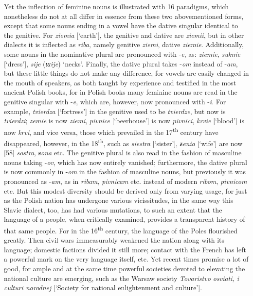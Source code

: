 Yet the inflection of feminine nouns is illustrated with 16 paradigms, which nonetheless do not at all differ in essence from these two abovementioned forms, except that some nouns ending in a vowel have the dative singular identical to the genitive. For \textit{ziemia} [‘earth’], the genitive and dative are \textit{ziemii}, but in other dialects it is inflected as \textit{riba}, namely genitive \textit{ziemi}, dative \textit{ziemie}. Additionally, some nouns in the nominative plural are pronounced with -\textit{e}, as: \textit{ziemie}, \textit{suknie} [‘dress’], \textit{sije} (\textit{шije}) ‘necks’. Finally, the dative plural takes -\textit{om} instead of -\textit{am}, but these little things do not make any difference, for vowels are easily changed in the mouth of speakers, as both taught by experience and testified in the most ancient Polish books, for in Polish books many feminine nouns are read in the genitive singular with -\textit{e}, which are, however, now pronounced with -\textit{i}. For example, \textit{tvierdza} [‘fortress’] in the genitive used to be \textit{tvierdze}, but now is \textit{tvierdzi}; \textit{zemie} is now \textit{ziemi}, \textit{pivnice} [‘beerhouse’] is now \textit{pivnici}, \textit{krvie} [‘blood’] is now \textit{krvi}, and vice versa, those which prevailed in the 17\textsuperscript{th} century have disappeared, however, in the 18\textsuperscript{th}, such as \textit{siestra} [‘sister’], \textit{ƶenia} [‘wife’] are now [58] \textit{sostra}, \textit{ƶona} etc. The genitive plural is also read in the fashion of masculine nouns taking -\textit{ov}, which has now entirely vanished; furthermore, the dative plural is now commonly in -\textit{om} in the fashion of masculine nouns, but previously it was pronounced as -\textit{am}, as in \textit{ribam}, \textit{pivnicam} etc. instead of modern \textit{ribom}, \textit{pivnicom} etc. But this modest diversity should be derived only from varying usage, for just as the Polish nation has undergone various vicissitudes, in the same way this Slavic dialect, too, has had various mutations, to such an extent that the language of a people, when critically examined, provides a transparent history of that same people. For in the 16\textsuperscript{th} century, the language of the Poles flourished greatly. Then civil wars immeasurably weakened the nation along with its language; domestic factions divided it still more; contact with the French has left a powerful mark on the very language itself, etc. Yet recent times promise a lot of good, for ample and at the same time powerful societies devoted to elevating the national culture are emerging, such as the Warsaw society \textit{Tovaristvo osviati, i culturi narodnej} [‘Society for national enlightenment and culture’].

